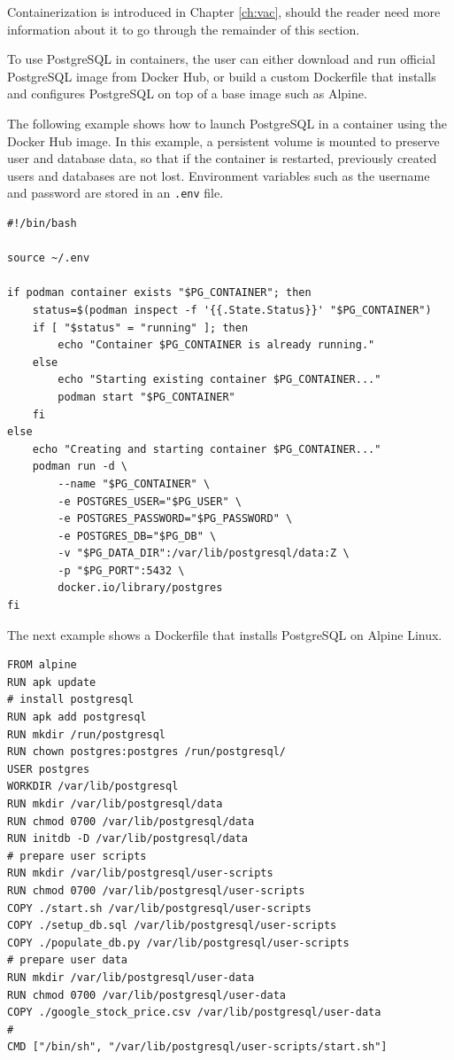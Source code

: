 Containerization is introduced in Chapter \ref{ch:vac}, should the reader need more information about it to go through the remainder of this section.

To use PostgreSQL in containers, the user can either download and run official PostgreSQL image from Docker Hub, or build a custom Dockerfile that installs and configures PostgreSQL on top of a base image such as Alpine. 

The following example shows how to launch PostgreSQL in a container using the Docker Hub image. In this example, a persistent volume is mounted to preserve user and database data, so that if the container is restarted, previously created users and databases are not lost. Environment variables such as the username and password are stored in an \verb|.env| file.

\begin{lstlisting}
#!/bin/bash

source ~/.env

if podman container exists "$PG_CONTAINER"; then
    status=$(podman inspect -f '{{.State.Status}}' "$PG_CONTAINER")
    if [ "$status" = "running" ]; then
        echo "Container $PG_CONTAINER is already running."
    else
        echo "Starting existing container $PG_CONTAINER..."
        podman start "$PG_CONTAINER"
    fi
else
    echo "Creating and starting container $PG_CONTAINER..."
    podman run -d \
        --name "$PG_CONTAINER" \
        -e POSTGRES_USER="$PG_USER" \
        -e POSTGRES_PASSWORD="$PG_PASSWORD" \
        -e POSTGRES_DB="$PG_DB" \
        -v "$PG_DATA_DIR":/var/lib/postgresql/data:Z \
        -p "$PG_PORT":5432 \
        docker.io/library/postgres
fi
\end{lstlisting}

The next example shows a Dockerfile that installs PostgreSQL on Alpine Linux.

\begin{lstlisting}
FROM alpine
RUN apk update
# install postgresql
RUN apk add postgresql
RUN mkdir /run/postgresql
RUN chown postgres:postgres /run/postgresql/
USER postgres
WORKDIR /var/lib/postgresql
RUN mkdir /var/lib/postgresql/data
RUN chmod 0700 /var/lib/postgresql/data
RUN initdb -D /var/lib/postgresql/data
# prepare user scripts
RUN mkdir /var/lib/postgresql/user-scripts
RUN chmod 0700 /var/lib/postgresql/user-scripts
COPY ./start.sh /var/lib/postgresql/user-scripts
COPY ./setup_db.sql /var/lib/postgresql/user-scripts
COPY ./populate_db.py /var/lib/postgresql/user-scripts
# prepare user data
RUN mkdir /var/lib/postgresql/user-data
RUN chmod 0700 /var/lib/postgresql/user-data
COPY ./google_stock_price.csv /var/lib/postgresql/user-data
#
CMD ["/bin/sh", "/var/lib/postgresql/user-scripts/start.sh"]
\end{lstlisting}

